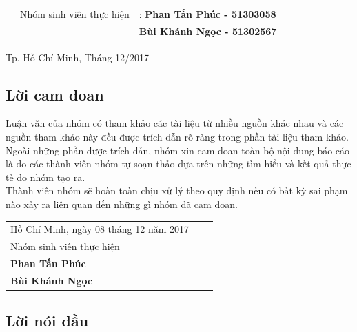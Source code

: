 \documentclass[a4paper,12pt]{article}
\begin{document}
\begin{titlepage}
\begin{table}[h]
\begin{tabular}{rrl}
				\vspace{0.5cm}
				\hspace{1.5 cm} & Nhóm sinh viên thực hiện & : \bf{Phan Tấn Phúc - 51303058}\\
				\hspace{1.5 cm} & \hspace{5 cm} &  \hspace{0.15cm} \bf{Bùi Khánh Ngọc - 51302567}\\
				
			\end{tabular}
		\end{table}
		\vspace{2cm}
		\begin{center}
			{\footnotesize Tp. Hồ Chí Minh, Tháng 12/2017}
		\end{center}
	\end{titlepage}
	\newpage
	\subsection*{Lời cam đoan}
	Luận văn của nhóm có tham khảo các tài liệu từ nhiều nguồn khác nhau và các nguồn tham khảo này đều được trích dẫn rõ ràng trong phần tài liệu tham khảo. Ngoài những phần được trích dẫn, nhóm xin cam đoan toàn bộ nội dung báo cáo là do các thành viên nhóm tự soạn thảo dựa trên những tìm hiểu và kết quả thực tế do nhóm tạo ra. \\
	Thành viên nhóm sẽ hoàn toàn chịu xử lý theo quy định nếu có bất kỳ sai phạm nào xảy ra liên quan đến những gì nhóm đã cam đoan.
	\begin{table}[h]
		\begin{tabular}{lll}
			\hspace{8cm} Hồ Chí Minh, ngày 08 tháng 12 năm 2017\\
			\hspace{10cm}Nhóm sinh viên thực hiện\\
			\hspace{10.5cm}\textbf{Phan Tấn Phúc}\\
			\hspace{10.5cm}\textbf{Bùi Khánh Ngọc}
		\end{tabular}
	\end{table}
	
	\newpage 
	\subsection*{Lời nói đầu}
	
\end{document}

